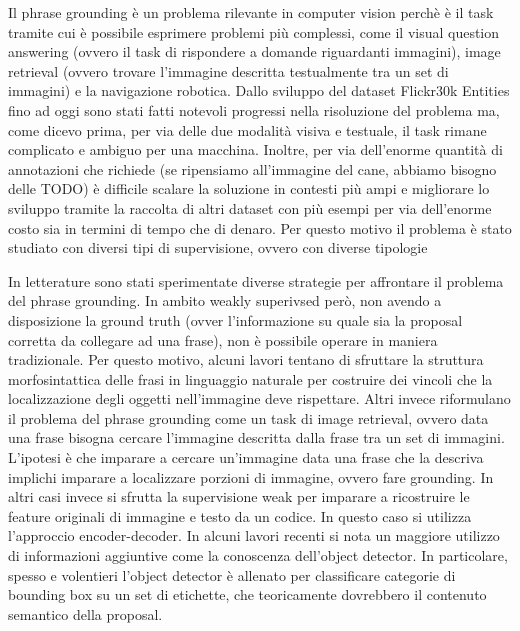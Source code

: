 \documentclass{article}
\begin{document}
Il phrase grounding è un problema rilevante in computer vision perchè
è il task tramite cui è possibile esprimere problemi più complessi,
come il visual question answering (ovvero il task di rispondere a
domande riguardanti immagini), image retrieval (ovvero trovare
l'immagine descritta testualmente tra un set di immagini) e la
navigazione robotica. Dallo sviluppo del dataset Flickr30k Entities
fino ad oggi sono stati fatti notevoli progressi nella risoluzione del
problema ma, come dicevo prima, per via delle due modalità visiva e
testuale, il task rimane complicato e ambiguo per una macchina.
Inoltre, per via dell'enorme quantità di annotazioni che richiede (se
ripensiamo all'immagine del cane, abbiamo bisogno delle TODO) è
difficile scalare la soluzione in contesti più ampi e migliorare lo
sviluppo tramite la raccolta di altri dataset con più esempi per via
dell'enorme costo sia in termini di tempo che di denaro. Per questo
motivo il problema è stato studiato con diversi tipi di supervisione,
ovvero con diverse tipologie


In letterature sono stati sperimentate diverse strategie per
affrontare il problema del phrase grounding. In ambito weakly
superivsed però, non avendo a disposizione la ground truth (ovver
l'informazione su quale sia la proposal corretta da collegare ad una
frase), non è possibile operare in maniera tradizionale. Per questo
motivo, alcuni lavori tentano di sfruttare la struttura
morfosintattica delle frasi in linguaggio naturale per costruire dei
vincoli che la localizzazione degli oggetti nell'immagine deve
rispettare. Altri invece riformulano il problema del phrase grounding
come un task di image retrieval, ovvero data una frase bisogna cercare
l'immagine descritta dalla frase tra un set di immagini. L'ipotesi è
che imparare a cercare un'immagine data una frase che la descriva
implichi imparare a localizzare porzioni di immagine, ovvero fare
grounding. In altri casi invece si sfrutta la supervisione weak per
imparare a ricostruire le feature originali di immagine e testo da un
codice. In questo caso si utilizza l'approccio encoder-decoder. In
alcuni lavori recenti si nota un maggiore utilizzo di informazioni
aggiuntive come la conoscenza dell'object detector. In particolare,
spesso e volentieri l'object detector è allenato per classificare
categorie di bounding box su un set di etichette, che teoricamente
dovrebbero il contenuto semantico della proposal.
\end{document}
